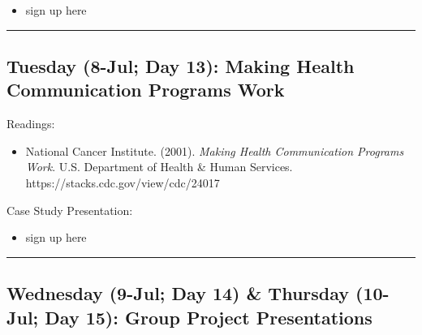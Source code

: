 \documentclass[
  letterpaper,
]{article}
\providecommand{\tightlist}{%
  \setlength{\itemsep}{0pt}\setlength{\parskip}{0pt}}\usepackage{longtable,booktabs,array}
\begin{document}
\begin{itemize}
\tightlist
\item
  sign up here
\end{itemize}

\begin{center}\rule{0.5\linewidth}{0.5pt}\end{center}

\hypertarget{tuesday-8-jul-day-13-making-health-communication-programs-work}{%
\subsection{Tuesday (8-Jul; Day 13): Making Health Communication
Programs
Work}\label{tuesday-8-jul-day-13-making-health-communication-programs-work}}

Readings:

\begin{itemize}
\tightlist
\item
  National Cancer Institute. (2001). \emph{Making Health Communication
  Programs Work}. U.S. Department of Health \& Human Services.
  https://stacks.cdc.gov/view/cdc/24017
\end{itemize}

Case Study Presentation:

\begin{itemize}
\tightlist
\item
  sign up here
\end{itemize}

\begin{center}\rule{0.5\linewidth}{0.5pt}\end{center}

\hypertarget{wednesday-9-jul-day-14-thursday-10-jul-day-15-group-project-presentations}{%
\subsection{Wednesday (9-Jul; Day 14) \& Thursday (10-Jul; Day 15):
Group Project
Presentations}\label{wednesday-9-jul-day-14-thursday-10-jul-day-15-group-project-presentations}}
\end{document}
